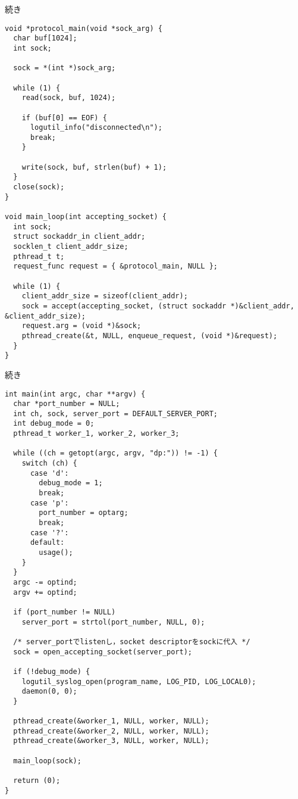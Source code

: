 \documentclass[10pt]{jarticle}
\begin{document}
\newpage

\begin{itembox}[l]{続き}
  \begin{verbatim}
void *protocol_main(void *sock_arg) {
  char buf[1024];
  int sock;

  sock = *(int *)sock_arg;

  while (1) {
    read(sock, buf, 1024);

    if (buf[0] == EOF) {
      logutil_info("disconnected\n");
      break;
    }

    write(sock, buf, strlen(buf) + 1);
  }
  close(sock);
}

void main_loop(int accepting_socket) {
  int sock;
  struct sockaddr_in client_addr;
  socklen_t client_addr_size;
  pthread_t t;
  request_func request = { &protocol_main, NULL };

  while (1) {
    client_addr_size = sizeof(client_addr);
    sock = accept(accepting_socket, (struct sockaddr *)&client_addr, &client_addr_size);
    request.arg = (void *)&sock;
    pthread_create(&t, NULL, enqueue_request, (void *)&request);
  }
}
  \end{verbatim}
\end{itembox}

\newpage

\begin{itembox}[l]{続き}
  \begin{verbatim}
int main(int argc, char **argv) {
  char *port_number = NULL;
  int ch, sock, server_port = DEFAULT_SERVER_PORT;
  int debug_mode = 0;
  pthread_t worker_1, worker_2, worker_3;

  while ((ch = getopt(argc, argv, "dp:")) != -1) {
    switch (ch) {
      case 'd':
        debug_mode = 1;
        break;
      case 'p':
        port_number = optarg;
        break;
      case '?':
      default:
        usage();
    }
  }
  argc -= optind;
  argv += optind;

  if (port_number != NULL)
    server_port = strtol(port_number, NULL, 0);

  /* server_portでlistenし，socket descriptorをsockに代入 */
  sock = open_accepting_socket(server_port);

  if (!debug_mode) {
    logutil_syslog_open(program_name, LOG_PID, LOG_LOCAL0);
    daemon(0, 0);
  }

  pthread_create(&worker_1, NULL, worker, NULL);
  pthread_create(&worker_2, NULL, worker, NULL);
  pthread_create(&worker_3, NULL, worker, NULL);

  main_loop(sock);

  return (0);
}
  \end{verbatim}
\end{itembox}
\end{document}
